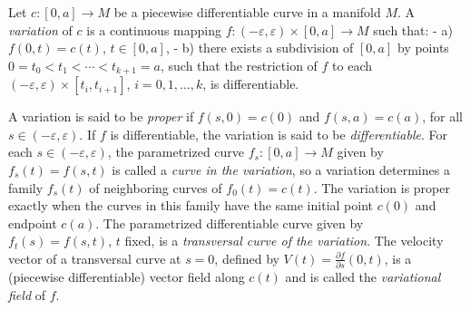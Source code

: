 \begin{definition}[variation]
  \label{def:dc-ch9-2-1}
  Let $c:[0,a]\to M$ be a piecewise differentiable curve in a manifold $M$. A
  \emph{variation} of $c$ is a continuous mapping $f:(-\varepsilon,\varepsilon)\times[0,a]\to M$
  such that:
  - a) $f(0,t)=c(t)$, $t\in[0,a]$,
  - b) there exists a subdivision of $[0,a]$ by points
  $0=t_0<t_1<\cdots<t_{k+1}=a$, such that the restriction of $f$ to each
  $(-\varepsilon,\varepsilon)\times[t_i,t_{i+1}]$, $i=0,1,\dots,k$, is differentiable.
  
  A variation is said to be \emph{proper} if $f(s,0)=c(0)$ and $f(s,a)=c(a)$, for all
  $s\in(-\varepsilon,\varepsilon)$. If $f$ is differentiable, the variation is said to be
  \emph{differentiable}. For each $s\in(-\varepsilon,\varepsilon)$, the parametrized curve
  $f_s:[0,a]\to M$ given by $f_s(t)=f(s,t)$ is called a \emph{curve in the variation}, so
  a variation determines a family $f_s(t)$ of neighboring curves of $f_0(t)=c(t)$.
  The variation is proper exactly when the curves in this family have the same
  initial point $c(0)$ and endpoint $c(a)$.
  The parametrized differentiable curve given by $f_t(s)=f(s,t)$, $t$ fixed, is a
  \emph{transversal curve of the variation}. The velocity vector of a transversal curve
  at $s=0$, defined by $V(t)=\frac{\partial f}{\partial s}(0,t)$, is a (piecewise
  differentiable) vector field along $c(t)$ and is called the \emph{variational field} of
  $f$.
\end{definition}

